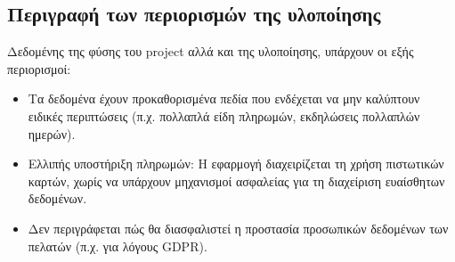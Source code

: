 \documentclass[a4paper, 11pt]{article}
\begin{document}
\subsection*{Περιγραφή των περιορισμών της υλοποίησης}
Δεδομένης της φύσης του project αλλά και της υλοποίησης, υπάρχουν οι εξής περιορισμοί:
\begin{itemize}
\item Τα δεδομένα έχουν προκαθορισμένα πεδία που ενδέχεται να μην καλύπτουν ειδικές περιπτώσεις (π.χ. πολλαπλά είδη πληρωμών, εκδηλώσεις πολλαπλών ημερών).
\item Ελλιπής υποστήριξη πληρωμών: Η εφαρμογή διαχειρίζεται τη χρήση πιστωτικών καρτών, χωρίς να υπάρχουν μηχανισμοί ασφαλείας για τη διαχείριση ευαίσθητων δεδομένων.
\item Δεν περιγράφεται πώς θα διασφαλιστεί η προστασία προσωπικών δεδομένων των πελατών (π.χ. για λόγους GDPR).
\end{itemize}
\end{document}
